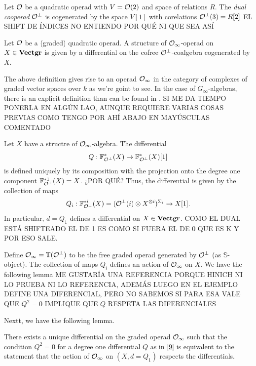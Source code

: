 \documentclass[TFM.tex]{subfiles}
\begin{document}
\begin{defi}
Let ${\mathcal O}$ be a quadratic operad with $V={\mathcal O}(2)$ and space of relations $R$. The \emph{dual cooperad} ${\mathcal O}^{\perp}$ is cogenerated by the space $V[1]$ with corelations ${\mathcal O}^\perp(3)=R[2]$ EL SHIFT DE ÍNDICES NO ENTIENDO POR QUÉ NI QUE SEA ASÍ
\end{defi}

\begin{defi}
Let ${\mathcal O}$ be a (graded) quadratic operad. A structure of ${\mathcal O}_\infty$-operad on $X\in\mathrm{\mathbf{Vectgr}}$ is given by a differential on the cofree ${\mathcal O}^\perp$-coalgebra cogenerated by $X$.
\end{defi}

The above definition gives rise to an operad ${\mathcal O}_\infty$ in the category of complexes of graded vector spaces over $k$ as we're goint to see. In the case of $G_\infty$-algebras, there is an explicit definition than can be found in \cite[Proposition 16]{Galvez}. SI ME DA TIEMPO PONERLA EN ALGÚN LAO, AUNQUE REQUIERE VARIAS COSAS PREVIAS COMO TENGO POR AHÍ ABAJO EN MAYÚSCULAS COMENTADO

Let $X$ have a structre of ${\mathcal O}_\infty$-algebra. The differential
\begin{equation}\label{9}
Q:\mathbb{F}^*_{{\mathcal O}^\perp}(X)\to \mathbb{F}^*_{{\mathcal O}^\perp}(X)[1]
\end{equation}
is defined uniquely by its composition with the projection onto the degree one component $\mathbb{F}^{*1}_{{\mathcal O}^\perp}(X)=X$. ¿POR QUÉ? Thus, the differential is given by the collection of maps
\[
Q_i:\mathbb{F}^{*i}_{{\mathcal O}^\perp}(X)=({\mathcal O}^\perp(i)\otimes X^{\otimes i})^{\Sigma_i}\to X[1].
\]
In particular, $d=Q_1$ defines a differential on $X\in\mathrm{\mathbf{Vectgr}}$. COMO EL DUAL ESTÁ SHIFTEADO EL DE 1 ES COMO SI FUERA EL DE 0 QUE ES K Y POR ESO SALE.

Define ${\mathcal O}_\infty=\mathbb{T}({\mathcal O}^\perp)$ to be the free graded operad generated by ${\mathcal O}^\perp$ (as $\mathbb{S}$-object). The collection of
maps $Q_i$ defines an action of ${\mathcal O}_\infty$ on $X$. We have the following lemma ME GUSTARÍA UNA REFERENCIA PORQUE HINICH NI LO PRUEBA NI LO REFERENCIA, ADEMÁS LUEGO EN EL EJEMPLO DEFINE UNA DIFERENCIAL, PERO NO SABEMOS SI PARA ESA VALE QUE $Q^2=0$ IMPLIQUE QUE $Q$ RESPETA LAS DIFERENCIALES

Nextt, we have the following lemma.
\begin{lemma}
There exists a unique differential on the graded operad ${\mathcal O}_\infty$ such that the condition $Q^2=0$ for a degree one differential $Q$ as in \ref{9} is equivalent to the statement that the action of ${\mathcal O}_\infty$ on $(X,d=Q_1)$ respects the differentials. 
\end{lemma}
\end{document}
